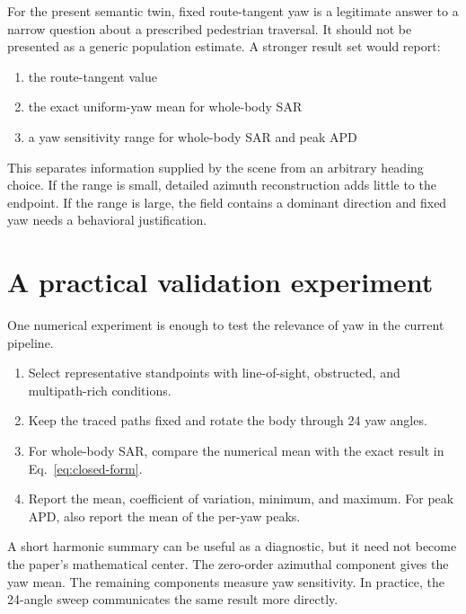 \documentclass[11pt]{article}
\begin{document}
For the present semantic twin, fixed route-tangent yaw is a legitimate answer
to a narrow question about a prescribed pedestrian traversal. It should not be
presented as a generic population estimate. A stronger result set would report:

\begin{enumerate}
  \item the route-tangent value

  \item the exact uniform-yaw mean for whole-body SAR

  \item a yaw sensitivity range for whole-body SAR and peak APD
\end{enumerate}

This separates information supplied by the scene from an arbitrary heading
choice. If the range is small, detailed azimuth reconstruction adds little to
the endpoint. If the range is large, the field contains a dominant direction
and fixed yaw needs a behavioral justification.

\section{A practical validation experiment}

One numerical experiment is enough to test the relevance of yaw in the current
pipeline.

\begin{enumerate}
  \item Select representative standpoints with line-of-sight, obstructed, and
  multipath-rich conditions.

  \item Keep the traced paths fixed and rotate the body through 24 yaw angles.

  \item For whole-body SAR, compare the numerical mean with the exact result in
  Eq.~\eqref{eq:closed-form}.

  \item Report the mean, coefficient of variation, minimum, and maximum. For
  peak APD, also report the mean of the per-yaw peaks.
\end{enumerate}

A short harmonic summary can be useful as a diagnostic, but it need not become
the paper's mathematical center. The zero-order azimuthal component gives the
yaw mean. The remaining components measure yaw sensitivity. In practice, the
24-angle sweep communicates the same result more directly.
\end{document}
